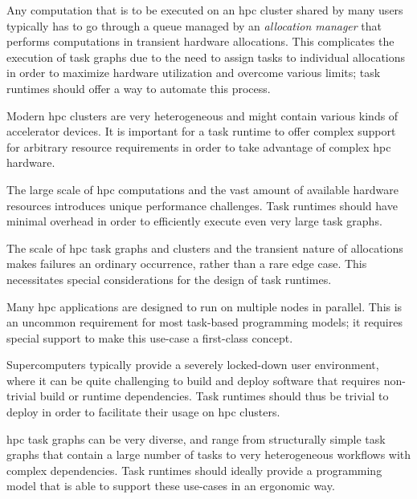 \begin{description}[wide=0pt, itemsep=1pt]
	\item[Allocation manager] Any computation that is to be executed on an \gls{hpc} cluster shared by many users
		typically has to go through a queue managed by an \emph{allocation manager} that performs computations
		in transient hardware allocations. This complicates the execution of task graphs due to the need to
		assign tasks to individual allocations in order to maximize hardware utilization and overcome
		various limits; task runtimes should offer a way to automate this process.
	\item[Cluster heterogeneity] Modern \gls{hpc} clusters are very heterogeneous and might contain various kinds of
		accelerator devices. It is important for a task runtime to offer complex support for arbitrary
		resource requirements in order to take advantage of complex \gls{hpc} hardware.
	\item[Performance and scalability] The large scale of \gls{hpc} computations and the vast amount of available hardware
		resources introduces unique performance challenges. Task runtimes should have minimal overhead in
		order to efficiently execute even very large task graphs.
	\item[Fault tolerance] The scale of \gls{hpc} task graphs and clusters and the transient nature of allocations
		makes failures an ordinary occurrence, rather than a rare edge case. This necessitates special
		considerations for the design of task runtimes.
	\item[Multi-node tasks] Many \gls{hpc} applications are designed to run on multiple nodes in parallel. This is
		an uncommon requirement for most task-based programming models; it requires special support to make
		this use-case a first-class concept.
	\item[Deployment] Supercomputers typically provide a severely locked-down user environment, where it can be quite
		challenging to build and deploy software that requires non-trivial build or runtime dependencies.
		Task runtimes should thus be trivial to deploy in order to facilitate their usage on
		\gls{hpc} clusters.
	\item[Programming model] \gls{hpc} task graphs can be very diverse, and
		range from structurally simple task graphs that contain a large number of tasks to very
		heterogeneous workflows with complex dependencies. Task runtimes should ideally provide a
		programming model that is able to support these use-cases in an ergonomic way.
\end{description}

